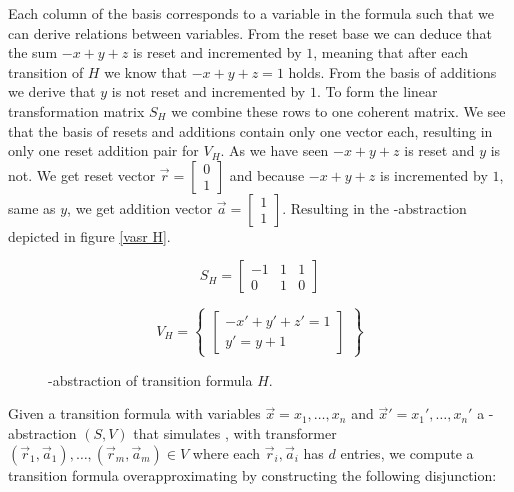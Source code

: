 Each column of the basis corresponds to a variable in the formula such that we can derive relations between variables. From the reset base we can deduce that the sum $-x + y + z$ is reset and incremented by $1$, meaning that after each transition of $H$ we know that $-x + y + z = 1$ holds. From the basis of additions we derive that $y$ is not reset and incremented by $1$. To form the linear transformation matrix $S_H$ we combine these rows to one coherent matrix. We see that the basis of resets and additions contain only one vector each, resulting in only one reset addition pair for $V_H$. As we have seen $-x + y + z$ is reset and $y$ is not. We get reset vector $\vec{r} = \begin{bmatrix} 0 \\ 1 \end{bmatrix}$ and because $-x + y + z$ is incremented by $1$, same as $y$, we get addition vector $\vec{a} = \begin{bmatrix} 1 \\ 1 \end{bmatrix}$. Resulting in the \qvasr-abstraction depicted in figure \ref{vasr  H}.
\vspace*{-2em}
\begin{figure}[H]
	\begin{center}
		\begin{minipage}{0.3\linewidth}
			\begin{equation*}
				S_H = \begin{bmatrix} -1 & 1 & 1 \\ 0 & 1 & 0 \end{bmatrix}
			\end{equation*}
		\end{minipage}
		\begin{minipage}{0.6\linewidth}
			\begin{equation*}
				V_H = \begin{Bmatrix} \begin{bmatrix} -x' + y' + z' = 1\\ y' = y + 1 \end{bmatrix} \end{Bmatrix}
			\end{equation*}
		\end{minipage}
		\caption{\qvasr-abstraction of transition formula $H$.}
		\label{vasr H}
	\end{center}
\end{figure}
\vspace*{-2em}
Given a transition formula \trf with variables $\vec{x} = x_1, \ldots, x_n$ and $\vec{x}' = x_1', \ldots, x_n'$ a \qvasr-abstraction $(S, V)$ that simulates \trf, with transformer $(\vec{r}_1, \vec{a}_1), \ldots, (\vec{r}_m, \vec{a}_m) \in V$ where each $\vec{r}_i, \vec{a}_i$ has $d$ entries, we compute a transition formula overapproximating \trf by constructing the following disjunction:
